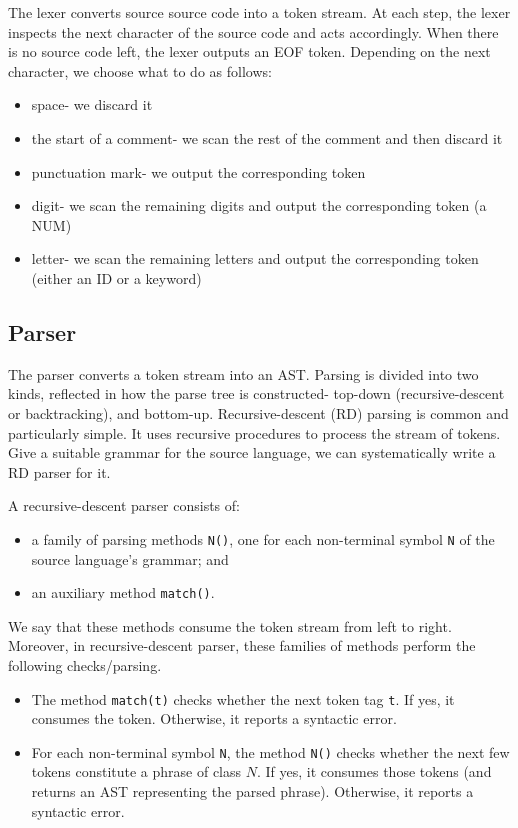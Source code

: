 \documentclass[a4paper, openany]{memoir}
\begin{document}
The lexer converts source source code into a token stream. At each step, the lexer inspects the next character of the source code and acts accordingly. When there is no source code left, the lexer outputs an EOF token. Depending on the next character, we choose what to do as follows:
\begin{itemize}
    \item space- we discard it
    \item the start of a comment- we scan the rest of the comment and then discard it
    \item punctuation mark- we output the corresponding token
    \item digit- we scan the remaining digits and output the corresponding token (a NUM)
    \item letter- we scan the remaining letters and output the corresponding token (either an ID or a keyword)
\end{itemize}

\subsection{Parser}
The parser converts a token stream into an AST. Parsing is divided into two kinds, reflected in how the parse tree is constructed- top-down (recursive-descent or backtracking), and bottom-up. Recursive-descent (RD) parsing is common and particularly simple. It uses recursive procedures to process the stream of tokens. Give a suitable grammar for the source language, we can systematically write a RD parser for it.

A recursive-descent parser consists of:
\begin{itemize}
    \item a family of parsing methods \texttt{N()}, one for each non-terminal symbol \texttt{N} of the source language's grammar; and
    \item an auxiliary method \texttt{match()}.
\end{itemize}
We say that these methods consume the token stream from left to right. Moreover, in recursive-descent parser, these families of methods perform the following checks/parsing.
\begin{itemize}
    \item The method \texttt{match(t)} checks whether the next token tag \texttt{t}. If yes, it consumes the token. Otherwise, it reports a syntactic error.
    \item For each non-terminal symbol \texttt{N}, the method \texttt{N()} checks whether the next few tokens constitute a phrase of class $N$. If yes, it consumes those tokens (and returns an AST representing the parsed phrase). Otherwise, it reports a syntactic error.
\end{itemize}
\end{document}
